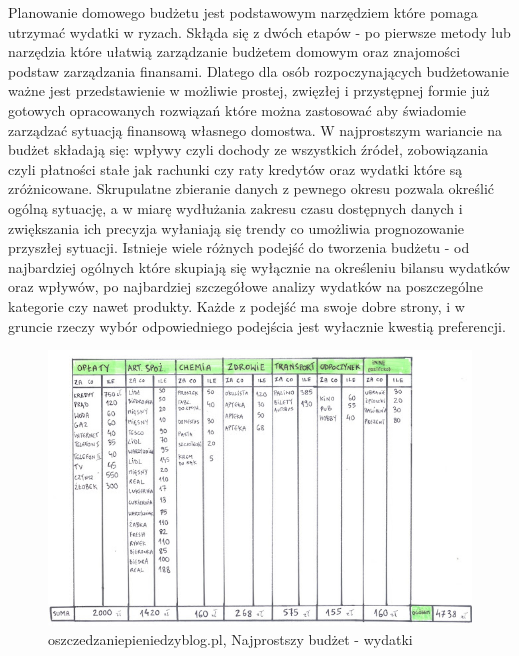 \documentclass[a4paper,10pt, twoside]{report}
\begin{document}
\begin{large}
{Planowanie domowego budżetu jest podstawowym narzędziem które pomaga utrzymać 
wydatki w ryzach. Skłąda się z dwóch etapów - po pierwsze metody lub narzędzia 
które ułatwią zarządzanie budżetem domowym oraz znajomości podstaw zarządzania 
finansami. Dlatego dla osób rozpoczynających budżetowanie ważne jest 
przedstawienie w możliwie prostej, zwięzłej i przystępnej formie już gotowych 
opracowanych rozwiązań które można zastosować aby świadomie zarządzać sytuacją 
finansową własnego domostwa. W najprostszym wariancie na 
budżet \cite{o24_budzetowanie}\cite{budget}\cite{iwućbudżet}\cite{mintbudget}\cite{ingbudżet} 
składają się: wpływy czyli dochody ze wszystkich źródeł, zobowiązania czyli 
płatności stałe jak rachunki czy raty kredytów oraz wydatki które są 
zróżnicowane. Skrupulatne zbieranie danych z pewnego okresu pozwala określić 
ogólną sytuację, a w miarę wydłużania zakresu czasu dostępnych danych i 
zwiększania ich precyzja wyłaniają się trendy co umożliwia prognozowanie 
przyszłej sytuacji. Istnieje wiele różnych podejść do tworzenia budżetu - od 
najbardziej ogólnych które skupiają się wyłącznie na określeniu bilansu wydatków
 oraz wpływów, po najbardziej szczegółowe analizy wydatków na poszczególne 
kategorie czy nawet produkty. Każde z podejść ma swoje dobre strony, i w gruncie
 rzeczy wybór odpowiedniego podejścia jest wyłacznie kwestią preferencji.}

\begin{figure}[H]           %
    \centering
    \includegraphics[width=12cm]{figures/oszczedzaniepieniedzyblog-pl_wydatki.jpg}
    \caption{oszczedzaniepieniedzyblog.pl, Najprostszy budżet - wydatki}
    \label{fig:prostybudżetwydatki}
\end{figure}


\end{large}
\end{document}
